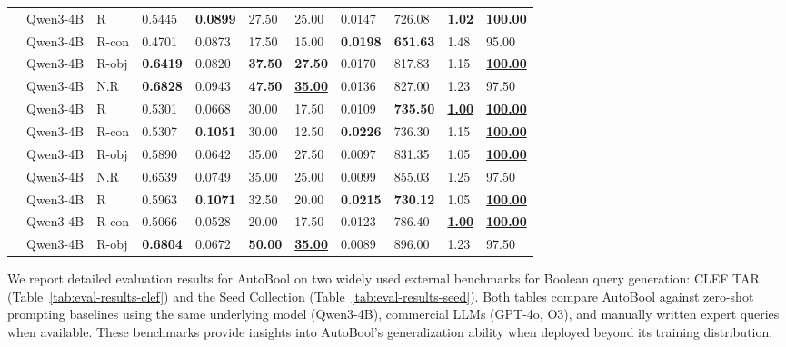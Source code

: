 \begin{table}[t]
\begin{tabular*}{\textwidth}{@{\extracolsep{\fill}}lllllllllll@{}}
			& Qwen3-4B & R & 0.5445 & \textbf{0.0899} & 27.50 & 25.00 & 0.0147 & 726.08 & \textbf{1.02} & \underline{\textbf{100.00}} \\
			& Qwen3-4B & R-con & 0.4701 & 0.0873 & 17.50 & 15.00 & \textbf{0.0198} & \textbf{651.63} & 1.48 & 95.00 \\
			& Qwen3-4B & R-obj & \textbf{0.6419} & 0.0820 & \textbf{37.50} & \textbf{27.50} & 0.0170 & 817.83 & 1.15 & \underline{\textbf{100.00}} \\
			\midrule
			 & Qwen3-4B & N.R & \textbf{0.6828} & 0.0943 & \textbf{47.50} & \underline{\textbf{35.00}} & 0.0136 & 827.00 & 1.23 & 97.50 \\
			& Qwen3-4B & R & 0.5301 & 0.0668 & 30.00 & 17.50 & 0.0109 & \textbf{735.50} & \underline{\textbf{1.00}} & \underline{\textbf{100.00}} \\
			& Qwen3-4B & R-con & 0.5307 & \textbf{0.1051} & 30.00 & 12.50 & \textbf{0.0226} & 736.30 & 1.15 & \underline{\textbf{100.00}} \\
			& Qwen3-4B & R-obj & 0.5890 & 0.0642 & 35.00 & 27.50 & 0.0097 & 831.35 & 1.05 & \underline{\textbf{100.00}} \\
			\midrule
			 & Qwen3-4B & N.R & 0.6539 & 0.0749 & 35.00 & 25.00 & 0.0099 & 855.03 & 1.25 & 97.50 \\
			& Qwen3-4B & R & 0.5963 & \textbf{0.1071} & 32.50 & 20.00 & \textbf{0.0215} & \textbf{730.12} & 1.05 & \underline{\textbf{100.00}} \\
			& Qwen3-4B & R-con & 0.5066 & 0.0528 & 20.00 & 17.50 & 0.0123 & 786.40 & \underline{\textbf{1.00}} & \underline{\textbf{100.00}} \\
			& Qwen3-4B & R-obj & \textbf{0.6804} & 0.0672 & \textbf{50.00} & \underline{\textbf{35.00}} & 0.0089 & 896.00 & 1.23 & 97.50 \\
			\bottomrule
		\end{tabular*}
\end{table}





We report detailed evaluation results for AutoBool on two widely used external benchmarks for Boolean query generation: CLEF TAR (Table~\ref{tab:eval-results-clef}) and the Seed Collection (Table~\ref{tab:eval-results-seed}). Both tables compare AutoBool against zero-shot prompting baselines using the same underlying model (Qwen3-4B), commercial LLMs (GPT-4o, O3), and manually written expert queries when available. These benchmarks provide insights into AutoBool's generalization ability when deployed beyond its training distribution.

